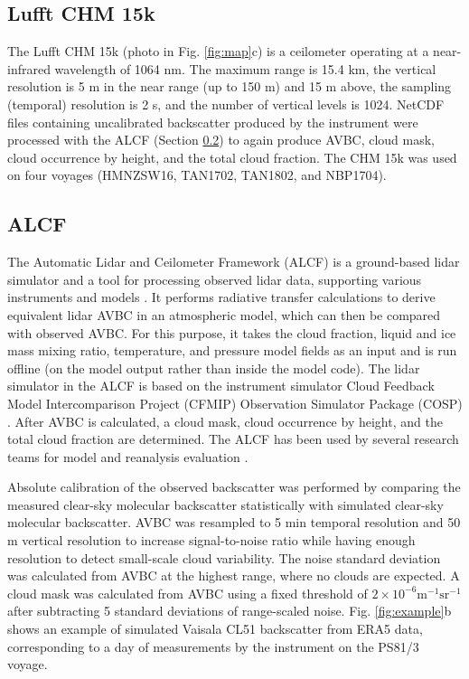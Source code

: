 \documentclass[12pt,a4paper]{article}
\begin{document}
\subsection{Lufft CHM 15k}
\label{sec:chm15k}

The Lufft CHM 15k (photo in Fig. \ref{fig:map}c) is a ceilometer operating at a
near-infrared wavelength of 1064 nm. The maximum range is 15.4 km, the vertical
resolution is 5 m in the near range (up to 150 m) and 15 m above, the sampling
(temporal) resolution is 2 s, and the number of vertical levels is 1024.
NetCDF files containing uncalibrated backscatter produced by the instrument
were processed with the ALCF (Section \ref{sec:alcf}) to again produce AVBC, cloud
mask, cloud occurrence by height, and the total cloud fraction. The CHM 15k was
used on four voyages (HMNZSW16, TAN1702, TAN1802, and NBP1704).

\subsection{ALCF}
\label{sec:alcf}

The Automatic Lidar and Ceilometer Framework (ALCF) is a ground-based lidar
simulator and a tool for processing observed lidar data, supporting various
instruments and models \citep{kuma2021}. It performs radiative transfer
calculations to derive equivalent lidar AVBC in an atmospheric model, which can
then be compared with observed AVBC. For this purpose, it takes the cloud fraction, liquid and ice mass mixing ratio, temperature, and
pressure model fields as an input and is run offline (on the model output rather than
inside the model code). The lidar simulator in the ALCF is based on the
instrument simulator Cloud Feedback Model Intercomparison Project (CFMIP)
Observation Simulator Package (COSP) \citep{bodas-salcedo2011}.  After AVBC is
calculated, a cloud mask, cloud occurrence by height, and the total cloud
fraction are determined. The ALCF has been used by several research teams for
model and reanalysis evaluation
\citep{kuma2020,kremser2021,guyot2022,pei2023,whitehead2023,mcdonald2024}.

Absolute calibration of the observed backscatter was performed by comparing the
measured clear-sky molecular backscatter statistically with simulated clear-sky
molecular backscatter. AVBC was resampled to 5 min temporal resolution and 50 m
vertical resolution to increase signal-to-noise ratio while having enough
resolution to detect small-scale cloud variability. The noise standard
deviation was calculated from AVBC at the highest range, where no clouds are
expected.  A cloud mask was calculated from AVBC using a fixed threshold of
$\mathrm{2\times 10^{-6} m^{-1}sr^{-1}}$ after subtracting 5 standard
deviations of range-scaled noise. Fig. \ref{fig:example}b shows an example of
simulated Vaisala CL51 backscatter from ERA5 data, corresponding to a day of
measurements by the instrument on the PS81/3 voyage.
\end{document}

